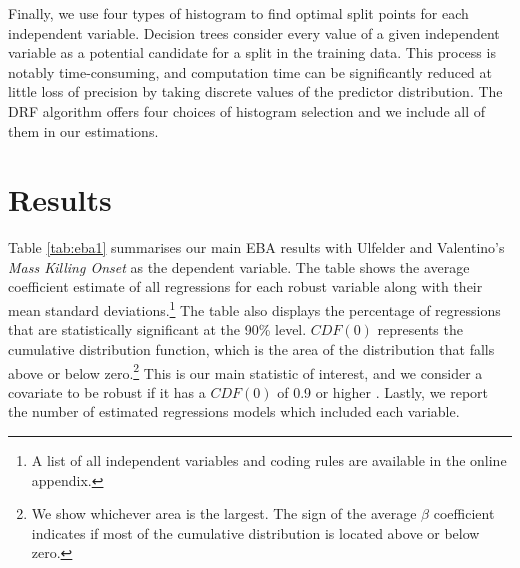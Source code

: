 Finally, we use four types of histogram to find optimal split points for each independent variable. Decision trees consider every value of a given independent variable as a potential candidate for a split in the training data. This process is notably time-consuming, and computation time can be significantly reduced at little loss of precision by taking discrete values of the predictor distribution. The DRF algorithm offers four choices of histogram selection and we include all of them in our estimations.

\section{Results}
\label{sec:results4}

Table \ref{tab:eba1} summarises our main EBA results with Ulfelder and Valentino's \citeyear{ulfelder2008assessing} \textit{Mass Killing Onset} as the dependent variable. The table shows the average coefficient estimate of all regressions for each robust variable along with their mean standard deviations.\footnote{A list of all independent variables and coding rules are available in the online appendix.} The table also displays the percentage of regressions that are statistically significant at the 90\% level. $CDF(0)$ represents the cumulative distribution function, which is the area of the distribution that falls above or below zero.\footnote{We show whichever area is the largest. The sign of the average $\beta$ coefficient indicates if most of the cumulative distribution is located above or below zero.} This is our main statistic of interest, and we consider a covariate to be robust if it has a $CDF(0)$ of 0.9 or higher \citep[181]{sala1997just}. Lastly, we report the number of estimated regressions models which included each variable.

